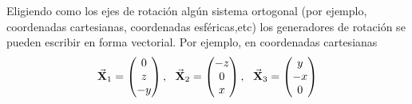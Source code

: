 Eligiendo como los ejes de rotación algún sistema ortogonal (por ejemplo, coordenadas cartesianas, coordenadas esféricas,etc) los generadores de rotación se pueden escribir en forma vectorial. Por ejemplo, en coordenadas cartesianas
\begin{align}
	\vec{\mathbf{X}}_1 =\begin{pmatrix}
	0\\
	z\\
	-y
	\end{pmatrix},\ \ \vec{\mathbf{X}}_2 =\begin{pmatrix}
	-z\\
	0\\
	x
	\end{pmatrix} , \ \ \vec{\mathbf{X}}_3 =\begin{pmatrix}
	y\\
	-x\\
	0
	\end{pmatrix} \label{eq:4.3.2.2}
\end{align}

